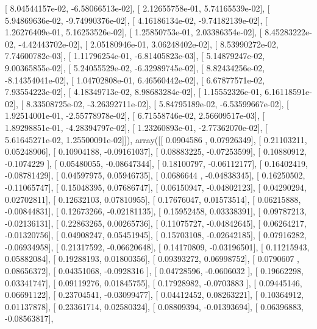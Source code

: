 \documentclass{article}
\begin{document}
       [  8.04544157e-02,  -6.58066513e-02],
       [  2.12655758e-01,   5.74165539e-02],
       [  5.94869636e-02,  -9.74990376e-02],
       [  4.16186134e-02,  -9.74182139e-02],
       [  1.26276409e-01,   5.16253526e-02],
       [  1.25850753e-01,   2.03386354e-02],
       [  8.45283222e-02,  -4.42443702e-02],
       [  2.05180946e-01,   3.06248402e-02],
       [  8.53990272e-02,   7.74600782e-03],
       [  1.11796254e-01,  -6.81405823e-03],
       [  5.14879247e-02,   9.00365855e-02],
       [  5.24055529e-02,  -6.32989745e-02],
       [  8.82434256e-02,  -8.14354041e-02],
       [  1.04702808e-01,   6.46560442e-02],
       [  6.67877571e-02,   7.93554223e-02],
       [  4.18349713e-02,   8.98683284e-02],
       [  1.15552326e-01,   6.16118591e-02],
       [  8.33508725e-02,  -3.26392711e-02],
       [  5.84795189e-02,  -6.53599667e-02],
       [  1.92514001e-01,  -2.55778978e-02],
       [  6.71558746e-02,   2.56609517e-03],
       [  1.89298851e-01,  -4.28394797e-02],
       [  1.23260893e-01,  -2.77362070e-02],
       [  5.61645271e-02,   1.25500091e-02]]), array([[ 0.0904586 ,  0.07926349],
       [ 0.21103211,  0.05248906],
       [ 0.10904188, -0.09161037],
       [ 0.08883225, -0.07253599],
       [ 0.10880912, -0.1074229 ],
       [ 0.05480055, -0.08647344],
       [ 0.18100797, -0.06112177],
       [ 0.16402419, -0.08781429],
       [ 0.04597975,  0.05946735],
       [ 0.0686644 , -0.04838345],
       [ 0.16250502, -0.11065747],
       [ 0.15048395,  0.07686747],
       [ 0.06150947, -0.04802123],
       [ 0.04290294,  0.02702811],
       [ 0.12632103,  0.07810955],
       [ 0.17676047,  0.01573514],
       [ 0.06215888, -0.00844831],
       [ 0.12673266, -0.02181135],
       [ 0.15952458,  0.03338391],
       [ 0.09787213, -0.02136131],
       [ 0.22863265,  0.00265736],
       [ 0.11075727, -0.04842645],
       [ 0.06264217, -0.01320756],
       [ 0.04908247,  0.05451945],
       [ 0.15703108, -0.02642185],
       [ 0.07916282, -0.06934958],
       [ 0.21317592, -0.06620648],
       [ 0.14170809, -0.03196501],
       [ 0.11215943,  0.05882084],
       [ 0.19288193,  0.01800356],
       [ 0.09393272,  0.06998752],
       [ 0.0790607 ,  0.08656372],
       [ 0.04351068, -0.0928316 ],
       [ 0.04728596, -0.0606032 ],
       [ 0.19662298,  0.03341747],
       [ 0.09119276,  0.01845755],
       [ 0.17928982, -0.0703883 ],
       [ 0.09445146,  0.06691122],
       [ 0.23704541, -0.03099477],
       [ 0.04412452,  0.08263221],
       [ 0.10364912,  0.01137878],
       [ 0.23361714,  0.02580324],
       [ 0.08809394, -0.01393694],
       [ 0.06396883, -0.08563817],
\end{document}
